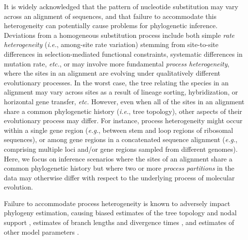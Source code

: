 \documentclass[11pt]{article}
\begin{document}
\newpage

\noindent
It is widely acknowledged that the pattern of nucleotide substitution may vary across an alignment of sequences, and that failure to accommodate this heterogeneity can potentially cause problems for phylogenetic inference.
Deviations from a homogeneous substitution process include both simple {\it rate heterogeneity} ({\it i.e.}, among-site rate variation) stemming from site-to-site differences in selection-mediated functional constraints, systematic differences in mutation rate, \textit{etc.}, or may involve more fundamental {\it process heterogeneity}, where the sites in an alignment are evolving under qualitatively different evolutionary processes.  
In the worst case, the tree relating the species in an alignment may vary across sites as a result of lineage sorting, hybridization, or horizontal gene transfer, {\it etc.}
However, even when all of the sites in an alignment share a common phylogenetic history ({\it i.e.}, tree topology), other aspects of their evolutionary 
process may differ.
For instance, process heterogeneity might occur within a single gene region ({\it e.g.}, between stem and loop regions of ribosomal sequences), or among gene regions in a concatenated sequence alignment ({\it e.g.}, comprising multiple loci and/or gene regions sampled from different genomes).  
Here, we focus on inference scenarios where the sites of an alignment share a common phylogenetic history but where two or more {\it process partitions} in the data  \citep[{\it sensu} ][]{bull93} may otherwise differ with respect to the underlying process of molecular evolution.

Failure to accommodate process heterogeneity is known to adversely impact phylogeny estimation, causing biased estimates of the tree topology and nodal support \citep{brandley05,brown07}, estimates of branch lengths and divergence times \citep{marshall06,poux08,venditti08}, and estimates of other model parameters \citep{nylander04,pagel04}.
 
\end{document}
